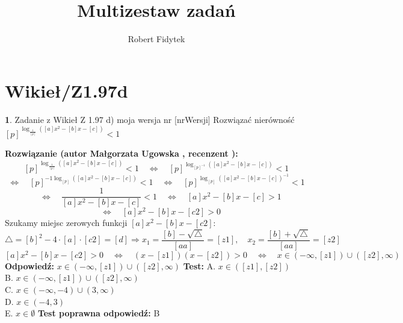 \documentclass[12pt, a4paper]{article}
\title{Multizestaw zadań}
\author{Robert Fidytek}
\date{}
\theoremstyle{definition} %
\newtheorem{zad}{}
\newcommand{\kategoria}[1]{\section{#1}} %
\newcommand{\zadStart}[1]{\begin{zad}#1\newline} %
\newcommand{\zadStop}{\end{zad}}   %
\newcommand{\rozwStart}[2]{\noindent \textbf{Rozwiązanie (autor #1 , recenzent #2): }\newline} %
\newcommand{\rozwStop}{\newline}                                            %
\newcommand{\odpStart}{\noindent \textbf{Odpowiedź:}\newline}    %
\newcommand{\odpStop}{\newline}                                             %
\newcommand{\testStart}{\noindent \textbf{Test:}\newline} %
\newcommand{\testStop}{\newline} %
\newcommand{\kluczStart}{\noindent \textbf{Test poprawna odpowiedź:}\newline} %
\newcommand{\kluczStop}{\newline} %
\begin{document}
\maketitle


\kategoria{Wikieł/Z1.97d}
\zadStart{Zadanie z Wikieł Z 1.97 d) moja wersja nr [nrWersji]}
Rozwiązać nierówno\'sć $[p]^{\log_{\frac{1}{[p]}}{([a]x^2-[b]x-[c])}}<1$
\zadStop
\rozwStart{Małgorzata Ugowska}{}
$$[p]^{\log_{\frac{1}{[p]}}{([a]x^2-[b]x-[c])}}<1 \quad \Longleftrightarrow \quad [p]^{\log_{[p]^{-1}}{([a]x^2-[b]x-[c])}}<1 $$
$$\Longleftrightarrow \quad [p]^{-1 \log_{[p]}{([a]x^2-[b]x-[c])}}<1 \quad \Longleftrightarrow \quad [p]^{\log_{[p]}{([a]x^2-[b]x-[c])^{-1}}}<1$$
$$\quad \Longleftrightarrow \quad \frac{1}{[a]x^2-[b]x-[c]}<1 \quad \Longleftrightarrow \quad [a]x^2-[b]x-[c]>1$$
$$\quad \Longleftrightarrow \quad [a]x^2-[b]x-[c2]>0$$
Szukamy miejsc zerowych funkcji $[a]x^2-[b]x-[c2]$:
$$ \bigtriangleup = [b]^2-4 \cdot [a] \cdot [c2] = [d] \Longrightarrow x_1=\frac{[b]-\sqrt{\bigtriangleup}}{[aa]} = [z1], \quad x_2=\frac{[b]+\sqrt{\bigtriangleup}}{[aa]} = [z2]$$
$$[a]x^2-[b]x-[c2]>0 \quad \Longleftrightarrow \quad (x-[z1])(x-[z2])>0 \quad \Longleftrightarrow \quad x \in (-\infty, [z1]) \cup ([z2],\infty)$$
\rozwStop
\odpStart
$x \in (-\infty, [z1]) \cup ([z2],\infty)$
\odpStop
\testStart
A. $x \in ([z1],[z2])$\\
B. $x \in (-\infty, [z1]) \cup ([z2],\infty)$\\
C. $x \in (-\infty, -4) \cup (3,\infty)$\\
D. $x \in (-4,3)$\\
E. $x \in \emptyset$
\testStop
\kluczStart
B
\kluczStop
\end{document}
